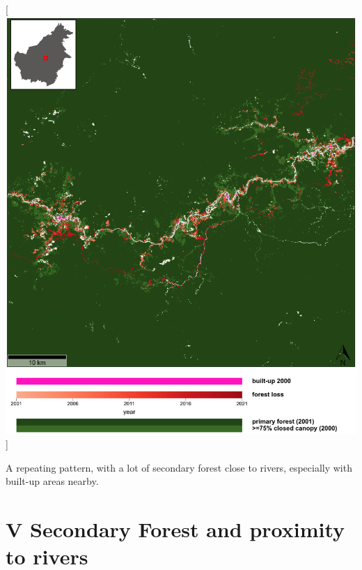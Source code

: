 \documentclass[
  letterpaper,
  DIV=11,
  numbers=noendperiod]{scrreprt}
\begin{document}
{[}\includegraphics[width=1\textwidth,height=\textheight]{text/../code/results/maps/reason_secondary_rivers.png}{]}
\normalcolor

A repeating pattern, with a lot of secondary forest close to rivers,
especially with built-up areas nearby. \newpage

\hypertarget{secondary-forest-and-proximity-to-rivers-1}{%
\section*{\texorpdfstring{\textsc{V} Secondary Forest and proximity to
rivers}{ Secondary Forest and proximity to rivers}}\label{secondary-forest-and-proximity-to-rivers-1}}


\color{white}
\end{document}
